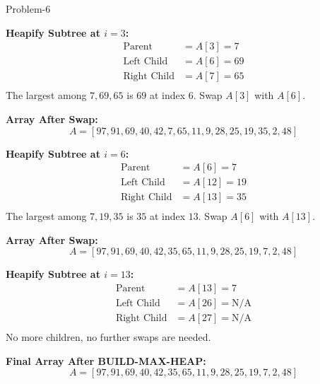 \begin{problem}{}{Problem-6}
\begin{enumerate}[label=(\roman*)]
		\textbf{Heapify Subtree at \( i = 3 \):} \\
		\[
		\begin{aligned}
			\text{Parent} &= A[3] = 7 \\
			\text{Left Child} &= A[6] = 69 \\
			\text{Right Child} &= A[7] = 65 \\
		\end{aligned}
		\]
		The largest among \( 7, 69, 65 \) is \( 69 \) at index \( 6 \). Swap \( A[3] \) with \( A[6] \).
		
		\textbf{Array After Swap:}
		\[
		A = [97, 91, 69, 40, 42, 7, 65, 11, 9, 28, 25, 19, 35, 2, 48]
		\]
		
		\textbf{Heapify Subtree at \( i = 6 \):} \\
		\[
		\begin{aligned}
			\text{Parent} &= A[6] = 7 \\
			\text{Left Child} &= A[12] = 19 \\
			\text{Right Child} &= A[13] = 35 \\
		\end{aligned}
		\]
		The largest among \( 7, 19, 35 \) is \( 35 \) at index \( 13 \). Swap \( A[6] \) with \( A[13] \).
		
		\textbf{Array After Swap:}
		\[
		A = [97, 91, 69, 40, 42, 35, 65, 11, 9, 28, 25, 19, 7, 2, 48]
		\]
		
		\textbf{Heapify Subtree at \( i = 13 \):} \\
		\[
		\begin{aligned}
			\text{Parent} &= A[13] = 7 \\
			\text{Left Child} &= A[26] = \text{N/A} \\
			\text{Right Child} &= A[27] = \text{N/A} \\
		\end{aligned}
		\]
		No more children, no further swaps are needed.
	
	\textbf{Final Array After BUILD-MAX-HEAP:}
	\[
	A = [97, 91, 69, 40, 42, 35, 65, 11, 9, 28, 25, 19, 7, 2, 48]
	\]
\end{enumerate}
	
\end{problem}




